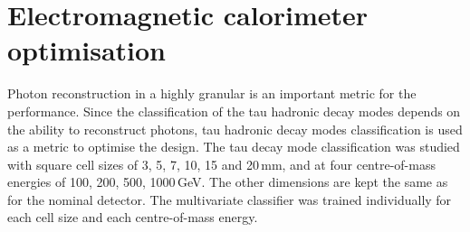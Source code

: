 







\section{Electromagnetic calorimeter optimisation}
\label{sec:tauECAL}

Photon reconstruction in a highly granular \ECAL is an important  metric for the \ECAL performance. Since the classification of the tau hadronic decay modes depends on the ability to reconstruct photons, tau hadronic decay modes classification is used as a metric to optimise the \ECAL design. The tau decay mode classification was studied with \ECAL square cell sizes of 3, 5, 7, 10, 15 and 20\,mm, and at four  centre-of-mass energies of 100, 200, 500, 1000\,GeV. The other \ECAL dimensions are kept the same as for  the \ILD nominal detector. The multivariate classifier was trained  individually for each \ECAL cell size and each centre-of-mass energy.



